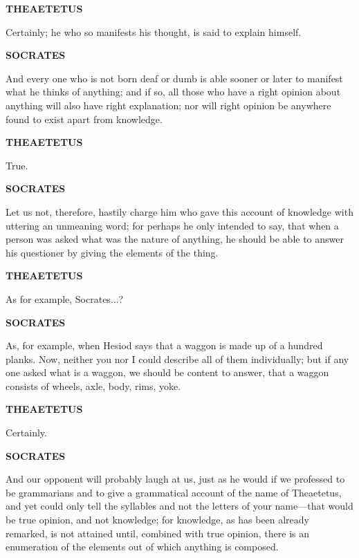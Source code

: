\documentclass[11pt,letter]{article}
\begin{document}
\par \textbf{THEAETETUS}
\par   Certainly; he who so manifests his thought, is said to explain himself.

\par \textbf{SOCRATES}
\par   And every one who is not born deaf or dumb is able sooner or later to manifest what he thinks of anything; and if so, all those who have a right opinion about anything will also have right explanation; nor will right opinion be anywhere found to exist apart from knowledge.

\par \textbf{THEAETETUS}
\par   True.

\par \textbf{SOCRATES}
\par   Let us not, therefore, hastily charge him who gave this account of knowledge with uttering an unmeaning word; for perhaps he only intended to say, that when a person was asked what was the nature of anything, he should be able to answer his questioner by giving the elements of the thing.

\par \textbf{THEAETETUS}
\par   As for example, Socrates...?

\par \textbf{SOCRATES}
\par   As, for example, when Hesiod says that a waggon is made up of a hundred planks. Now, neither you nor I could describe all of them individually; but if any one asked what is a waggon, we should be content to answer, that a waggon consists of wheels, axle, body, rims, yoke.

\par \textbf{THEAETETUS}
\par   Certainly.

\par \textbf{SOCRATES}
\par   And our opponent will probably laugh at us, just as he would if we professed to be grammarians and to give a grammatical account of the name of Theaetetus, and yet could only tell the syllables and not the letters of your name—that would be true opinion, and not knowledge; for knowledge, as has been already remarked, is not attained until, combined with true opinion, there is an enumeration of the elements out of which anything is composed.
\end{document}

